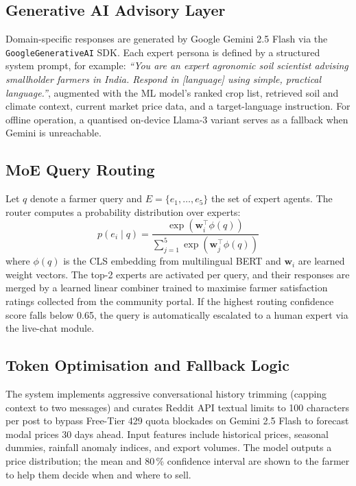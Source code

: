 \documentclass[conference]{IEEEtran}
\begin{document}
\subsection{Generative AI Advisory Layer}
Domain-specific responses are generated by Google Gemini 2.5 Flash via the
\texttt{GoogleGenerativeAI} SDK. Each expert persona is defined by a structured
system prompt, for example: \textit{``You are an expert agronomic soil
scientist advising smallholder farmers in India. Respond in [language] using
simple, practical language.''}, augmented with the ML model's ranked crop
list, retrieved soil and climate context, current market price data, and a
target-language instruction. For offline operation, a quantised on-device
Llama-3 variant serves as a fallback when Gemini is unreachable.

\subsection{MoE Query Routing}

Let $q$ denote a farmer query and $E = \{e_1, \ldots, e_5\}$ the set of
expert agents. The router computes a probability distribution over experts:
\begin{equation}
  p(e_i \mid q) = \frac{\exp(\mathbf{w}_i^\top \phi(q))}
                        {\sum_{j=1}^{5} \exp(\mathbf{w}_j^\top \phi(q))}
  \label{eq:router}
\end{equation}
where $\phi(q)$ is the CLS embedding from multilingual BERT and
$\mathbf{w}_i$ are learned weight vectors. The top-2 experts are activated
per query, and their responses are merged by a learned linear combiner trained
to maximise farmer satisfaction ratings collected from the community portal.
If the highest routing confidence score falls below 0.65, the query is
automatically escalated to a human expert via the live-chat module.

\subsection{Token Optimisation and Fallback Logic}
The system implements aggressive conversational history trimming (capping context to two messages) and curates Reddit API textual limits to 100 characters per post to bypass Free-Tier 429 quota blockades on Gemini 2.5 Flash
to forecast modal prices 30 days ahead. Input features include historical
prices, seasonal dummies, rainfall anomaly indices, and export volumes. The
model outputs a price distribution; the mean and 80\,\% confidence interval
are shown to the farmer to help them decide when and where to sell.
\end{document}
